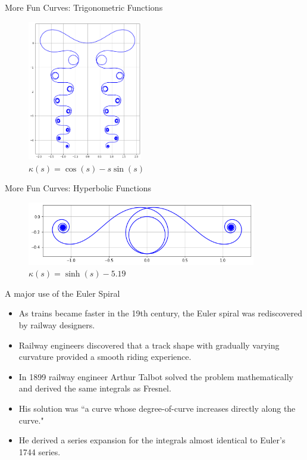 \documentclass{beamer}
\begin{document}
\begin{frame}{More Fun Curves: Trigonometric Functions}
	\begin{figure}
		\caption{$\kappa(s) = \cos(s) - s \sin(s)$}
		\centering
		\includegraphics[width=50mm, scale=0.2]{elegant_madness.png}
	\end{figure}
\end{frame}
	
\begin{frame}{More Fun Curves: Hyperbolic Functions}
	\begin{figure}
		\caption{$\kappa(s) = \sinh(s) - 5.19$}
		\centering
		\includegraphics[width=100mm, scale=0.5]{sinh.png}
	\end{figure}
\end{frame}

\begin{frame}{A major use of the Euler Spiral}
	\begin{itemize}
		\item As trains became faster in the 19th century, the Euler spiral was rediscovered by railway designers.
		\item Railway engineers discovered that a track shape with gradually varying curvature provided a smooth riding experience.
		\item In 1899 railway engineer Arthur Talbot solved the problem mathematically and derived the same integrals as Fresnel.
		\item His solution was ``a curve whose degree-of-curve increases directly along the curve."
		\item He derived a series expansion for the integrals almost identical to Euler's 1744 series. 
	\end{itemize}
\end{frame}
\end{document}
